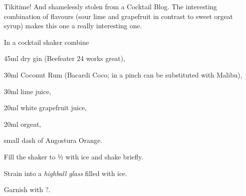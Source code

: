 \startsection[title={NiuNaut},reference=niunaut]
Tikitime! And shamelessly stolen from a Cocktail Blog. The interesting
combination of flavours (sour lime and grapefruit in contrast to sweet
orgeat syrup) makes this one a really interesting one.

\startitemize
\item In a cocktail shaker combine
      \startitemize
      \item 45ml dry gin (Beefeater 24 works great),
      \item 30ml Coconut Rum (Bacardi Coco; in a pinch can be
            substituted with Malibu),
      \item 30ml lime juice,
      \item 20ml white grapefruit juice,
      \item 20ml orgeat,
      \item small dash of Angostura Orange.
      \stopitemize
\item Fill the shaker to ½ with ice and shake briefly.
\item Strain into a {\em highball glass} filled with ice.
\item Garnish with \tr ?.
\stopitemize
\stopsection
